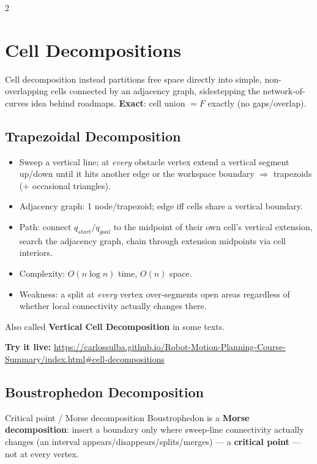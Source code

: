 \documentclass[10pt,a4paper]{article}
\newcommand{\keyterm}[1]{\textbf{#1}}
\newcommand{\demo}[1]{\textbf{Try it live:} \url{#1}}
\begin{document}
\begin{multicols}{2}
\section{Cell Decompositions}
Cell decomposition instead partitions free space directly into simple, non-overlapping cells connected by an adjacency graph, sidestepping the network-of-curves idea behind roadmaps. \keyterm{Exact}: cell union $=F$ exactly (no gaps/overlap).

\subsection{Trapezoidal Decomposition}
\begin{itemize}
\item Sweep a vertical line; at \emph{every} obstacle vertex extend a vertical segment up/down until it hits another edge or the workspace boundary $\Rightarrow$ trapezoids (+ occasional triangles).
\item Adjacency graph: 1 node/trapezoid; edge iff cells share a vertical boundary.
\item Path: connect $q_{start}/q_{goal}$ to the midpoint of their own cell's vertical extension, search the adjacency graph, chain through extension midpoints via cell interiors.
\item Complexity: $O(n\log n)$ time, $O(n)$ space.
\item Weakness: a split at \emph{every} vertex over-segments open areas regardless of whether local connectivity actually changes there.
\end{itemize}

\begin{notebox}
Also called \keyterm{Vertical Cell Decomposition} in some texts.
\end{notebox}
\begin{democallout}
\demo{https://carlossulba.github.io/Robot-Motion-Planning-Course-Summary/index.html\#cell-decompositions}
\end{democallout}

\subsection{Boustrophedon Decomposition}
\begin{defbox}{Critical point / Morse decomposition}
Boustrophedon is a \keyterm{Morse decomposition}: insert a boundary only where sweep-line connectivity actually changes (an interval appears/disappears/splits/merges) — a \keyterm{critical point} — not at every vertex.
\end{defbox}


\end{multicols}
\end{document}
